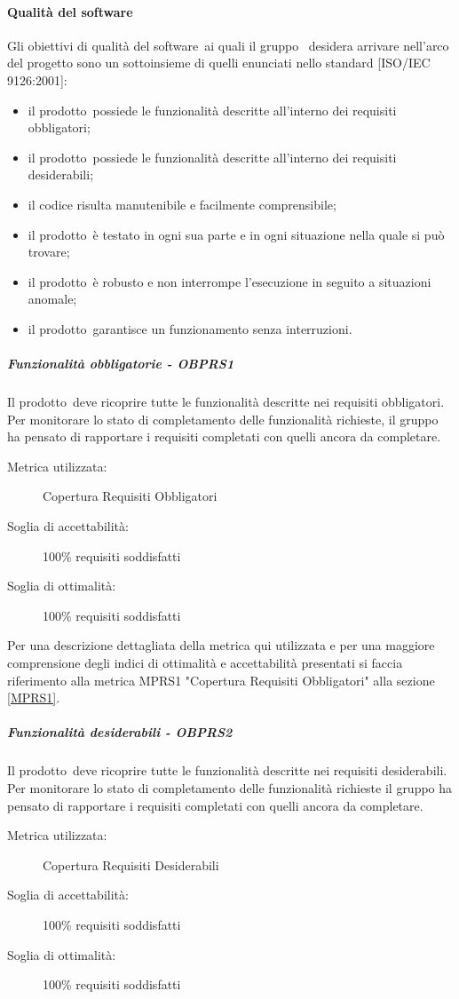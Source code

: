 \documentclass[../PianoDiQualifica.tex]{subfiles}
\begin{document}
			\paragraph{Qualità del software}
			Gli obiettivi di qualità del software\g\ ai quali il gruppo \leaf\ desidera arrivare nell'arco del progetto sono un sottoinsieme di quelli enunciati nello standard [ISO/IEC 9126:2001]:
		\begin{itemize}
			\item il prodotto\g\ possiede le funzionalità descritte all'interno dei requisiti obbligatori;
			\item il prodotto\g\ possiede le funzionalità descritte all'interno dei requisiti desiderabili;
			\item il codice risulta manutenibile e facilmente comprensibile;
			\item il prodotto\g\ è testato in ogni sua parte e in ogni situazione nella quale si può trovare;
			\item il prodotto\g\ è robusto e non interrompe l'esecuzione in seguito a situazioni anomale\g;
			\item il prodotto\g{}arantisce un funzionamento senza interruzioni.
		\end{itemize}
				\subparagraph{Funzionalità obbligatorie - OBPRS1}
				Il prodotto\g\ deve ricoprire tutte le funzionalità descritte nei requisiti obbligatori. Per monitorare lo stato di completamento delle funzionalità richieste, il gruppo ha pensato di rapportare i requisiti completati con quelli ancora da completare.
					\begin{description}
						\item [Metrica utilizzata:] Copertura Requisiti Obbligatori
						\item [Soglia di accettabilità:] 100\% requisiti soddisfatti
						\item [Soglia di ottimalità:] 100\% requisiti soddisfatti
					\end{description}
					Per una descrizione dettagliata della metrica qui utilizzata e per una maggiore comprensione degli indici di ottimalità e accettabilità presentati si faccia riferimento alla metrica MPRS1 "Copertura Requisiti Obbligatori" alla sezione \ref{MPRS1}.
				\subparagraph{Funzionalità desiderabili - OBPRS2}	
				Il prodotto\g\ deve ricoprire tutte le funzionalità descritte nei requisiti desiderabili. Per monitorare lo stato di completamento delle funzionalità richieste il gruppo ha pensato di rapportare i requisiti completati con quelli ancora da completare.
					\begin{description}
						\item [Metrica utilizzata:] Copertura Requisiti Desiderabili
						\item [Soglia di accettabilità:] 100\% requisiti soddisfatti
						\item [Soglia di ottimalità:] 100\% requisiti soddisfatti
					\end{description}
\end{document}
